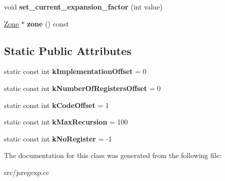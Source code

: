 \begin{DoxyCompactItemize}
\item 
\hypertarget{classv8_1_1internal_1_1_reg_exp_compiler_a7dfe84e5b220d01d26a496de3774dedf}{}void {\bfseries set\+\_\+current\+\_\+expansion\+\_\+factor} (int value)\label{classv8_1_1internal_1_1_reg_exp_compiler_a7dfe84e5b220d01d26a496de3774dedf}

\item 
\hypertarget{classv8_1_1internal_1_1_reg_exp_compiler_a8758b3a29e43faa02250fa9c9f1f437c}{}\hyperlink{classv8_1_1internal_1_1_zone}{Zone} $\ast$ {\bfseries zone} () const \label{classv8_1_1internal_1_1_reg_exp_compiler_a8758b3a29e43faa02250fa9c9f1f437c}

\end{DoxyCompactItemize}
\subsection*{Static Public Attributes}
\begin{DoxyCompactItemize}
\item 
\hypertarget{classv8_1_1internal_1_1_reg_exp_compiler_a25cdd87f20befcbf492dba4d8879d7db}{}static const int {\bfseries k\+Implementation\+Offset} = 0\label{classv8_1_1internal_1_1_reg_exp_compiler_a25cdd87f20befcbf492dba4d8879d7db}

\item 
\hypertarget{classv8_1_1internal_1_1_reg_exp_compiler_a3f79771d4cc180edef0a3873e9b08b5e}{}static const int {\bfseries k\+Number\+Of\+Registers\+Offset} = 0\label{classv8_1_1internal_1_1_reg_exp_compiler_a3f79771d4cc180edef0a3873e9b08b5e}

\item 
\hypertarget{classv8_1_1internal_1_1_reg_exp_compiler_aba94df58a0e68431d9ba15eee19a9546}{}static const int {\bfseries k\+Code\+Offset} = 1\label{classv8_1_1internal_1_1_reg_exp_compiler_aba94df58a0e68431d9ba15eee19a9546}

\item 
\hypertarget{classv8_1_1internal_1_1_reg_exp_compiler_a20ca0907396d11d68732f878a36b5cc3}{}static const int {\bfseries k\+Max\+Recursion} = 100\label{classv8_1_1internal_1_1_reg_exp_compiler_a20ca0907396d11d68732f878a36b5cc3}

\item 
\hypertarget{classv8_1_1internal_1_1_reg_exp_compiler_a70d86cf98e453fe3aad673ccd021092e}{}static const int {\bfseries k\+No\+Register} = -\/1\label{classv8_1_1internal_1_1_reg_exp_compiler_a70d86cf98e453fe3aad673ccd021092e}

\end{DoxyCompactItemize}


The documentation for this class was generated from the following file\+:\begin{DoxyCompactItemize}
\item 
src/jsregexp.\+cc\end{DoxyCompactItemize}
